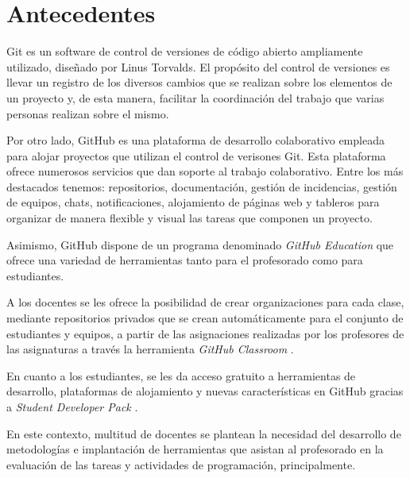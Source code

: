 
\section{Antecedentes}
\label{1:sec:1}

Git es un software de control de versiones de código abierto ampliamente utilizado, diseñado por Linus Torvalds.
El propósito del control de versiones es llevar un registro de los diversos cambios que se realizan sobre
los elementos de un proyecto y, de esta manera, facilitar la coordinación del trabajo que varias personas
realizan sobre el mismo.
\bigskip

Por otro lado, GitHub es una plataforma de desarrollo colaborativo empleada para alojar proyectos que utilizan el control de verisones Git.
Esta plataforma ofrece numerosos servicios que dan soporte al trabajo colaborativo. Entre los más destacados tenemos: repositorios, documentación,
gestión de incidencias, gestión de equipos, chats, notificaciones, alojamiento de páginas web y tableros para organizar de manera flexible y visual las tareas que componen un proyecto.
\bigskip

Asimismo, GitHub dispone de un programa denominado {\it GitHub Education} que ofrece una variedad de herramientas tanto para el profesorado como para estudiantes.
\bigskip

A los docentes se les ofrece la posibilidad de crear organizaciones para cada clase, mediante repositorios privados que se crean automáticamente para el conjunto de estudiantes y equipos,
a partir de las asignaciones realizadas por los profesores de las asignaturas a través la herramienta {\it GitHub Classroom }.
\bigskip

En cuanto a los estudiantes, se les da acceso gratuito a herramientas de desarrollo, plataformas de alojamiento y nuevas características en GitHub gracias a {\it Student Developer Pack }.
\bigskip

En este contexto, multitud de docentes se plantean la necesidad del desarrollo de metodologías e implantación de herramientas
que asistan al profesorado en la evaluación de las tareas y actividades de programación, principalmente.
